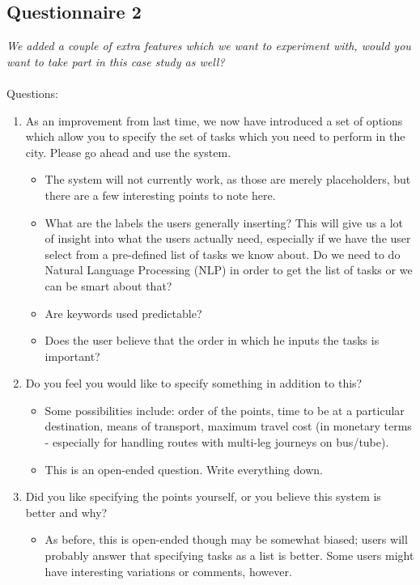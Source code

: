 \documentclass[a4paper, 10pt]{article}
\begin{document}
\newpage
\subsection*{Questionnaire 2}
\textit{We added a couple of extra features which we want to experiment with, would you want to take part in this case study as well?} \\\\ Questions:
\begin{enumerate}
\item As an improvement from last time, we now have introduced a set of options which allow you to specify the set of tasks which you need to perform in the city. Please go ahead and use the system. \begin{itemize}
\item The system will not currently work, as those are merely placeholders, but there are a few interesting points to note here.
\item What are the labels the users generally inserting? This will give us a lot of insight into what the users actually need, especially if we have the user select from a pre-defined list of tasks we know about. Do we need to do Natural Language Processing (NLP) in order to get the list of tasks or we can be smart about that? 
\item Are keywords used predictable?
\item Does the user believe that the order in which he inputs the tasks is important?
\end{itemize}
\item Do you feel you would like to specify something in addition to this? \begin{itemize}
\item Some possibilities include: order of the points, time to be at a particular destination, means of transport, maximum travel cost (in monetary terms - especially for handling routes with multi-leg journeys on bus/tube).
\item This is an open-ended question. Write everything down.
\end{itemize}
\item Did you like specifying the points yourself, or you believe this system is better and why?
\begin{itemize}
\item As before, this is open-ended though may be somewhat biased; users will probably answer that specifying tasks as a list is better. Some users might have interesting variations or comments, however.
\end{itemize}
\end{enumerate}
\end{document}
